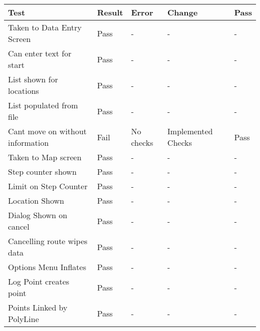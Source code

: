 \begin{table}[H]
\begin{tabular}{|l|l|l|l|l|}
\hline
\textbf{Test}                    & \textbf{Result} & \textbf{Error}        & \textbf{Change}             & \textbf{Pass} \\ \hline
Taken to Data Entry Screen       & Pass            & -                     & -                           & -             \\ \hline
Can enter text for start         & Pass            & -                     & -                           & -             \\ \hline
List shown for locations         & Pass            & -                     & -                           & -             \\ \hline
List populated from file         & Pass            & -                     & -                           & -             \\ \hline
Cant move on without information & Fail            & No checks             & Implemented Checks          & Pass          \\ \hline
Taken to Map screen              & Pass            & -                     & -                           & -             \\ \hline
Step counter shown               & Pass            & -                     & -                           & -             \\ \hline
Limit on Step Counter            & Pass            & -                     & -                           & -             \\ \hline
Location Shown                   & Pass            & -                     & -                           & -             \\ \hline
Dialog Shown on cancel           & Pass            & -                     & -                           & -             \\ \hline
Cancelling route wipes data      & Pass            & -                     & -                           & -             \\ \hline
Options Menu Inflates            & Pass            & -                     & -                           & -             \\ \hline
Log Point creates point          & Pass            & -                     & -                           & -             \\ \hline
Points Linked by PolyLine        & Pass            & -                     & -                           & -             \\ \hline

\end{tabular}
\end{table}
